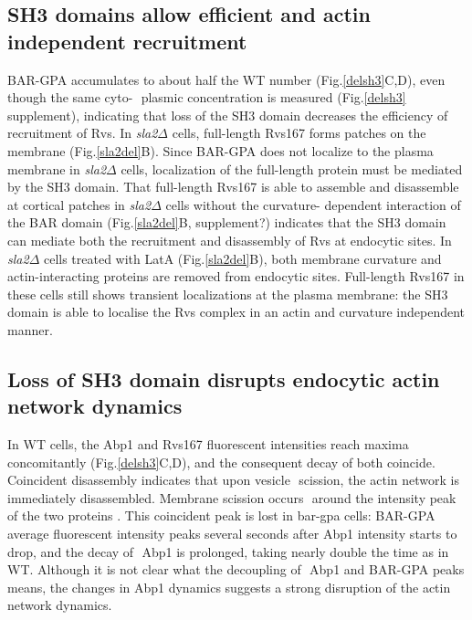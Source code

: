 \documentclass[9pt,lineno]{elife}
\begin{document}
\subsection{SH3 domains allow efficient and actin independent recruitment}

BAR-GPA accumulates to about half the WT number (Fig.\ref{delsh3}C,D), even though the same cyto-  plasmic concentration is measured (Fig.\ref{delsh3} supplement), indicating that loss of the SH3 domain decreases the efficiency of recruitment of Rvs. In \textit{sla2$\Delta$} cells, full-length Rvs167 forms patches on the membrane (Fig.\ref{sla2del}B). Since BAR-GPA does not localize to the plasma membrane in \textit{sla2$\Delta$} cells, localization of the full-length protein must be mediated by the SH3 domain. That full-length Rvs167 is able to assemble and disassemble at cortical patches in \textit{sla2$\Delta$} cells without the curvature- dependent interaction of the BAR domain (Fig.\ref{sla2del}B, supplement?) indicates that the SH3 domain can mediate both the recruitment and disassembly of Rvs at endocytic sites. In \textit{sla2$\Delta$} cells treated with LatA (Fig.\ref{sla2del}B), both membrane curvature and actin-interacting proteins are removed from endocytic sites. Full-length Rvs167 in these cells still shows transient localizations at the plasma membrane: the SH3 domain is able to localise the Rvs complex in an actin and curvature independent manner.  

\subsection{Loss of SH3 domain disrupts endocytic actin network dynamics}
In WT cells, the Abp1 and Rvs167 fluorescent intensities reach maxima concomitantly (Fig.\ref{delsh3}C,D), and the consequent decay of both coincide. Coincident disassembly indicates that upon vesicle  scission, the actin network is immediately disassembled. Membrane scission occurs  around the intensity peak of the two proteins \cite{Kukulski2012,Picco2015}. This coincident peak is lost in bar-gpa cells: BAR-GPA average fluorescent intensity peaks several seconds after Abp1 intensity starts to drop, and the decay of  Abp1 is prolonged, taking nearly double the time as in WT. Although it is not clear what the decoupling of  Abp1 and BAR-GPA peaks means, the changes in Abp1 dynamics suggests a strong disruption of the actin  network dynamics.
\end{document}
